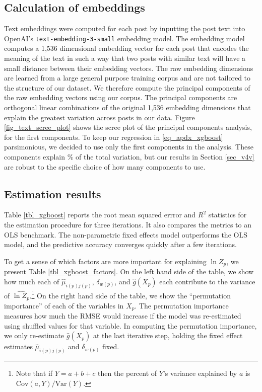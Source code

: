 \subsection{Calculation of embeddings}

Text embeddings were computed for each post by inputting the post text into \mbox{OpenAI's} \texttt{text-embedding-3-small} embedding model. The embedding model computes a 1,536 dimensional embedding vector for each post that encodes the meaning of the text in such a way that two posts with similar text will have a small distance between their embedding vectors. The raw embedding dimensions are learned from a large general purpose training corpus and are not tailored to the structure of our dataset. We therefore compute the principal components of the raw embedding vectors using our corpus. The principal components are orthogonal linear combinations of the original 1,536 embedding dimensions that explain the greatest variation across posts in our data. Figure \ref{fig_text_scree_plot} shows the scree plot of the principal components analysis, for the first  components. To keep our regression in \eqref{eq_apdx_xgboost} parsimonious, we decided to use only the first  components in the analysis. These components explain  \% of the total variation,  but our results in Section \ref{sec_v4v} are robust to the specific choice of how many components to use. 

\subsection{Estimation results}

Table \ref{tbl_xgboost} reports the root mean squared errror and $R^2$ statistics for the estimation procedure for three iterations. It also compares the metrics to an OLS benchmark. The non-parametric fixed effects model outperforms the OLS model, and the predictive accuracy converges quickly after a few iterations. 

To get a sense of which factors are more important for explaining $\ln Z_p$, we present Table \ref{tbl_xgboost_factors}. On the left hand side of the table, we show how much each of $\hat{\mu}_{i(p)j(p)}$, $\delta_{w(p)}$, and $\hat{g}(X_p)$ each contribute to the variance of $\widehat{\ln Z_p}$.\footnote{Note that if $Y = a + b +c$ then the percent of $Y$'s variance explained by $a$ is $\text{Cov}(a,Y)/\text{Var}(Y)$.} On the right hand side of the table, we show the ``permutation importance'' of each of the variables in $X_p$. The permutation importance measures how much the RMSE would increase if the model was re-estimated using shuffled values for that variable. In computing the permutation importance, we only re-estimate $\hat{g}(X_p)$ at the last iterative step, holding the fixed effect estimates $\hat{\mu}_{i(p)j(p)}$ and $\delta_{w(p)}$ fixed.

